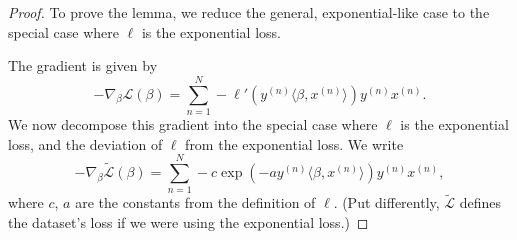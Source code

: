 \documentclass{article}
\theoremstyle{plain}
\theoremstyle{definition}
\theoremstyle{remark}
\begin{document}
\begin{proof}
To prove the lemma, we reduce the general, exponential-like case to the special case where $\ell$ is the exponential loss.

The gradient is given by
\begin{equation}
    -\nabla_{\beta}\mathcal{L}(\beta)=\sum_{n=1}^N-\ell'(y^{(n)}\langle\beta,x^{(n)}\rangle)y^{(n)}x^{(n)}.
\end{equation}
We now decompose this gradient into the special case where $\ell$ is the exponential loss, and the deviation of $\ell$ from the exponential loss.
We write
\begin{equation}
    -\nabla_{\beta}\tilde{\mathcal{L}}(\beta)=\sum_{n=1}^N-c\exp(-ay^{(n)}\langle\beta,x^{(n)}\rangle)y^{(n)}x^{(n)},
\end{equation}
where $c$, $a$ are the constants from the definition of $\ell$.
(Put differently, $\tilde{\mathcal{L}}$ defines the dataset's loss if we were using the exponential loss.)


\end{proof}
\end{document}

